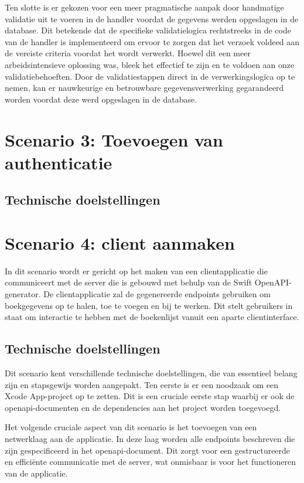 Ten slotte is er  gekozen voor een meer pragmatische aanpak door handmatige validatie uit te voeren in de handler voordat de gegevens werden opgeslagen in de database. Dit betekende dat de specifieke validatielogica rechtstreeks in de code van de handler is implementeerd om ervoor te zorgen dat het verzoek voldeed aan de vereiste criteria voordat het wordt verwerkt. Hoewel dit een meer arbeidsintensieve oplossing was, bleek het effectief te zijn en te voldoen aan onze validatiebehoeften. Door de validatiestappen direct in de verwerkingslogica op te nemen, kan er nauwkeurige en betrouwbare gegevensverwerking gegarandeerd worden voordat deze werd opgeslagen in de database.


\section{Scenario 3: Toevoegen van authenticatie}

\subsection{Technische doelstellingen}

\section{Scenario 4: client aanmaken}
In dit scenario wordt er gericht op het maken van een clientapplicatie die communiceert met de server die is gebouwd met behulp van de Swift OpenAPI-generator. De clientapplicatie zal de gegenereerde endpoints gebruiken om boekgegevens op te halen, toe te voegen en bij te werken. Dit stelt gebruikers in staat om interactie te hebben met de boekenlijst vanuit een aparte clientinterface.


\subsection{Technische doelstellingen}
Dit scenario kent verschillende technische doelstellingen, die van essentieel belang zijn en stapsgewijs worden aangepakt. Ten eerste is er een noodzaak om een Xcode App-project op te zetten. Dit is een cruciale eerste stap waarbij er ook de openapi-documenten en de dependencies aan het project worden toegevoegd. 

Het volgende cruciale aspect van dit scenario is het toevoegen van een netwerklaag aan de applicatie. In deze laag worden alle endpoints beschreven die zijn gespecificeerd in het openapi-document. Dit zorgt voor een gestructureerde en efficiënte communicatie met de server, wat onmisbaar is voor het functioneren van de applicatie.

